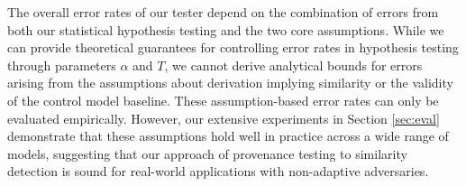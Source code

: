 The overall error rates of our tester depend on the combination of errors from both our statistical hypothesis testing and the two core assumptions. While we can provide theoretical guarantees for controlling error rates in hypothesis testing through parameters $\alpha$ and $T$, we cannot derive analytical bounds for errors arising from the assumptions about derivation implying similarity or the validity of the control model baseline. These assumption-based error rates can only be evaluated empirically. However, our extensive experiments in Section \ref{sec:eval} demonstrate that these assumptions hold well in practice across a wide range of models, suggesting that our approach of provenance testing to similarity detection is sound for real-world applications with non-adaptive adversaries.
